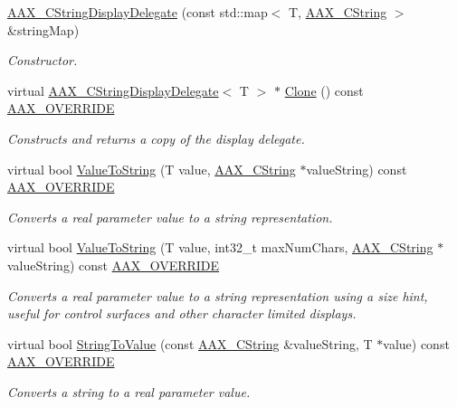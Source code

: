 \begin{DoxyCompactItemize}
\item 
\hyperlink{a00044_a675d5d95e04e023b0650c621ddaf4972}{A\+A\+X\+\_\+\+C\+String\+Display\+Delegate} (const std\+::map$<$ T, \hyperlink{a00042}{A\+A\+X\+\_\+\+C\+String} $>$ \&string\+Map)
\begin{DoxyCompactList}\small\item\em Constructor. \end{DoxyCompactList}\item 
virtual \hyperlink{a00044}{A\+A\+X\+\_\+\+C\+String\+Display\+Delegate}$<$ T $>$ $\ast$ \hyperlink{a00044_a011fc2e134ffa0469ee995232922bcb2}{Clone} () const \hyperlink{a00149_ac2f24a5172689ae684344abdcce55463}{A\+A\+X\+\_\+\+O\+V\+E\+R\+R\+I\+D\+E}
\begin{DoxyCompactList}\small\item\em Constructs and returns a copy of the display delegate. \end{DoxyCompactList}\item 
virtual bool \hyperlink{a00044_a96ae6bc68f2a2df5224539b4b07f914b}{Value\+To\+String} (T value, \hyperlink{a00042}{A\+A\+X\+\_\+\+C\+String} $\ast$value\+String) const \hyperlink{a00149_ac2f24a5172689ae684344abdcce55463}{A\+A\+X\+\_\+\+O\+V\+E\+R\+R\+I\+D\+E}
\begin{DoxyCompactList}\small\item\em Converts a real parameter value to a string representation. \end{DoxyCompactList}\item 
virtual bool \hyperlink{a00044_a5b5af0bb407230879e3cf7f952ad4de9}{Value\+To\+String} (T value, int32\+\_\+t max\+Num\+Chars, \hyperlink{a00042}{A\+A\+X\+\_\+\+C\+String} $\ast$value\+String) const \hyperlink{a00149_ac2f24a5172689ae684344abdcce55463}{A\+A\+X\+\_\+\+O\+V\+E\+R\+R\+I\+D\+E}
\begin{DoxyCompactList}\small\item\em Converts a real parameter value to a string representation using a size hint, useful for control surfaces and other character limited displays. \end{DoxyCompactList}\item 
virtual bool \hyperlink{a00044_a465943be762c4c273eb19f2272800ed0}{String\+To\+Value} (const \hyperlink{a00042}{A\+A\+X\+\_\+\+C\+String} \&value\+String, T $\ast$value) const \hyperlink{a00149_ac2f24a5172689ae684344abdcce55463}{A\+A\+X\+\_\+\+O\+V\+E\+R\+R\+I\+D\+E}
\begin{DoxyCompactList}\small\item\em Converts a string to a real parameter value. \end{DoxyCompactList}\end{DoxyCompactItemize}
